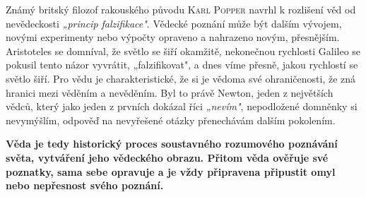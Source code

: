       Známý britský filozof rakouského původu \textsc{Karl Popper} navrhl k rozlišení věd od
      nevědeckosti \emph{„princip falzifikace"}. Vědecké poznání může být dalším vývojem, novými
      experimenty nebo výpočty opraveno a nahrazeno novým, přesnějším. Aristoteles se domníval, že
      světlo se šiří okamžitě, nekonečnou rychlosti Galileo se pokusil tento názor vyvrátit,
      „falzifikovat", a dnes víme přesně, jakou rychlostí se světlo šiří. Pro vědu je
      charakteristické, že si je vědoma své ohraničenosti, že zná hranici mezi věděním a nevěděním.
      Byl to právě Newton, jeden z největších vědců, který jako jeden z prvních dokázal říci
      \emph{„nevím"}, nepodložené domněnky si nevymýšlím, odpověď na nevyřešené otázky přenechávám
      dalším pokolením.

      \textbf{Věda je tedy historický proces soustavného rozumového poznávání světa, vytváření jeho
      vědeckého obrazu. Přitom věda ověřuje své poznatky, sama sebe opravuje a je vždy připravena
      připustit omyl nebo nepřesnost svého poznání. \cite[s.~15]{Stoll2009}}

